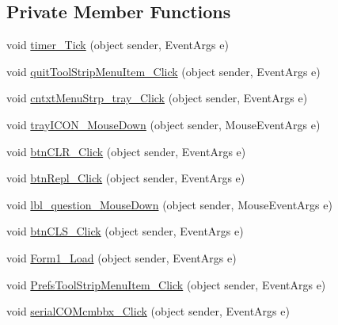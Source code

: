 \subsection*{\-Private \-Member \-Functions}
\begin{DoxyCompactItemize}
\item 
void \hyperlink{class_sr_p___classroom_inq_1_1frm_classrrom_inq_a07132b1925da00a6b4673e893f719465}{timer\-\_\-\-Tick} (object sender, \-Event\-Args e)
\item 
void \hyperlink{class_sr_p___classroom_inq_1_1frm_classrrom_inq_a1f6806f1c728c11daf09a988688026d5}{quit\-Tool\-Strip\-Menu\-Item\-\_\-\-Click} (object sender, \-Event\-Args e)
\item 
void \hyperlink{class_sr_p___classroom_inq_1_1frm_classrrom_inq_a325bb727a0d57d70b73a2359a575fb17}{cntxt\-Menu\-Strp\-\_\-tray\-\_\-\-Click} (object sender, \-Event\-Args e)
\item 
void \hyperlink{class_sr_p___classroom_inq_1_1frm_classrrom_inq_a330b68176bb55528b630df4e077b6fb9}{tray\-I\-C\-O\-N\-\_\-\-Mouse\-Down} (object sender, \-Mouse\-Event\-Args e)
\item 
void \hyperlink{class_sr_p___classroom_inq_1_1frm_classrrom_inq_a5577422488a2959e7e039a95d85506cd}{btn\-C\-L\-R\-\_\-\-Click} (object sender, \-Event\-Args e)
\item 
void \hyperlink{class_sr_p___classroom_inq_1_1frm_classrrom_inq_a65ba92a7bf3839c796abc965f5524b0f}{btn\-Repl\-\_\-\-Click} (object sender, \-Event\-Args e)
\item 
void \hyperlink{class_sr_p___classroom_inq_1_1frm_classrrom_inq_a58eac2c8a22afb14b3090a1cdd73ea1b}{lbl\-\_\-question\-\_\-\-Mouse\-Down} (object sender, \-Mouse\-Event\-Args e)
\item 
void \hyperlink{class_sr_p___classroom_inq_1_1frm_classrrom_inq_a39589edc035bae2c2775afcea57d2798}{btn\-C\-L\-S\-\_\-\-Click} (object sender, \-Event\-Args e)
\item 
void \hyperlink{class_sr_p___classroom_inq_1_1frm_classrrom_inq_ac71625cc47c0a4bfa92bd4f83e8c7bb6}{\-Form1\-\_\-\-Load} (object sender, \-Event\-Args e)
\item 
void \hyperlink{class_sr_p___classroom_inq_1_1frm_classrrom_inq_abce1cb97617c664a4d967eed8c5f9c86}{\-Prefs\-Tool\-Strip\-Menu\-Item\-\_\-\-Click} (object sender, \-Event\-Args e)
\item 
void \hyperlink{class_sr_p___classroom_inq_1_1frm_classrrom_inq_a07401ed0357e442240346cc777bf5acd}{serial\-C\-O\-Mcmbbx\-\_\-\-Click} (object sender, \-Event\-Args e)

\end{DoxyCompactItemize}
